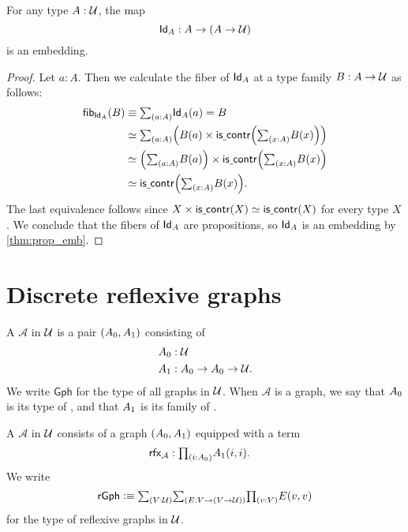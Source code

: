 \begin{prp}
For any type $A:\mathcal{U}$, the map
\begin{equation*}
\mathsf{Id}_{A}:A\to (A\to\mathcal{U})
\end{equation*}
is an embedding.
\end{prp}

\begin{proof}
Let $a:A$. Then we calculate the fiber of $\mathsf{Id}_{A}$ at a type family $B:A\to \mathcal{U}$ as follows:
\begin{align*}
\fib{\idtypevar{A}}{B} & \jdeq \sm{a:A}\idtypevar{A}(a)=B \\
& \eqvsym \sm{a:A} \Big(B(a)\times\iscontr\Big(\sm{x:A}B(x)\Big)\Big) \\
& \eqvsym \Big(\sm{a:A}B(a)\Big)\times \iscontr\Big(\sm{x:A}B(x)\Big) \\
& \eqvsym \iscontr\Big(\sm{x:A}B(x)\Big).
\end{align*}
The last equivalence follows since $X\times \mathsf{is\underline{\ }{}contr}(X)\simeq \mathsf{is\underline{\ }{}contr}(X)$ for every type $X$. We conclude that the fibers of $\mathsf{Id}_{A}$ are propositions, so $\mathsf{Id}_{A}$ is an embedding by \cref{thm:prop_emb}.
\end{proof}

\section{Discrete reflexive graphs}

\begin{defn}\label{defn:graphs_ctx}
A  $\mathcal{A}$ in $\mathcal{U}$ is a pair $\pairr{\pts{A},\edg{A}}$ consisting of
\begin{align*}
\pts{A} & : \UU \\
\edg{A} & : \pts{A}\to\pts{A}\to\UU.
\end{align*}
We write $\mathsf{Gph}$ for the type of all graphs in $\mathcal{U}$. When $\mathcal{A}$ is a graph, we say that $\pts{A}$ is its type of , and that $\edg{A}$ is its family of .

A  $\mathcal{A}$ in $\mathcal{U}$ consists of a graph $(\pts{A},\edg{A})$ equipped with a  term
\begin{align*}
\rfx{\mathcal{A}} & : \prd{i:\pts{A}}\edg{A}(i,i).
\end{align*}
We write
\begin{equation*}
\mathsf{rGph}\defeq \sm{V:\UU}{E:V\to (V\to\UU)}\prd{v:V}E(v,v)
\end{equation*}
for the type of reflexive graphs in $\mathcal{U}$. 
\end{defn}

